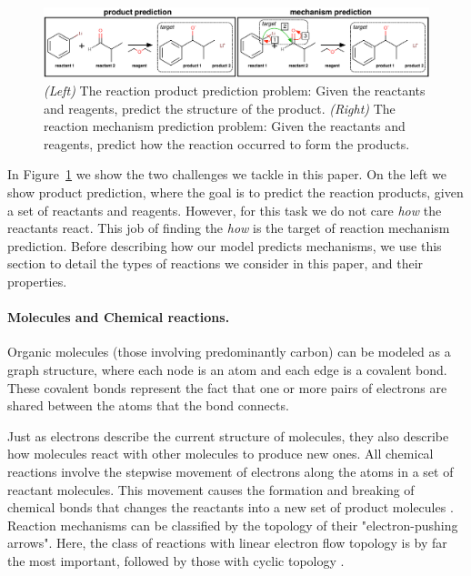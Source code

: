 

\begin{figure}[t!]
\centering
\includegraphics[width=\textwidth]{reaction_diagram}
\caption{\emph{(Left)} The reaction product prediction problem: Given the reactants and reagents, predict the structure of the product. \emph{(Right)} The reaction mechanism prediction problem: Given the reactants and reagents, predict how the reaction occurred to form the products.}
\label{fig:task-overview}

\end{figure}


In Figure~\ref{fig:task-overview} we show the two challenges we tackle in this paper. 
On the left we show product prediction, where the goal is to predict the reaction products, given a set of reactants and reagents. However, for this task we do not care {\em how} the reactants react.
 This job of finding the {\em how} is the target of reaction mechanism prediction. 
 Before describing how our model predicts mechanisms, we use this section to detail the types of reactions we consider in this paper, and their properties.



\vspace{-0.15cm}
\paragraph{Molecules and Chemical reactions.}


Organic molecules (those involving predominantly carbon) can be modeled as a graph structure, where each node is an atom and each edge is a covalent bond.
These covalent bonds represent the fact that 
one or more pairs of electrons are shared between the atoms that the bond connects. 


Just as electrons describe the current structure of molecules, 
they also describe how molecules react with other molecules to produce new ones. All chemical reactions involve the stepwise movement of electrons along the atoms in a set of reactant molecules. 
This movement causes the formation and breaking of chemical bonds that changes the reactants into a new set of product molecules \cite{herges1994coarctate}. 
%
Reaction mechanisms can be classified by the topology of their "electron-pushing arrows". Here, the class of reactions with linear electron flow topology is by far the most important, followed by those with cyclic topology \citep{herges1994coarctate}.

